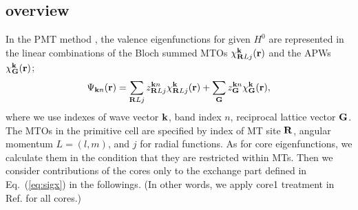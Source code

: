\documentclass[twocolumn,showpacs,preprintnumbers,amsmath,amssymb,floatfix]{revtex4-1}
\newcommand{\bfk}{{\bf k}}
\newcommand{\bfr}{{\bf r}}
\newcommand{\bfG}{{\bf G}}
\newcommand{\bfR}{{\bf R}}
\def\Psikn{\Psi_{{\bf k}n}}
\def\H0{H^0}
\newcommand{\req}[1]{\mbox{Eq.~\!(\ref{#1})}}
\def\Psikn{{\Psi_{{\bf k}n}}}
\def\brl{{\bf R}L}
\def\Psikn{{\Psi_{{\bf k}n}}}
\def\brl{{\bf R}L}
\def\H0{H^0}
\def\Psikn{{\Psi_{{\bf k}n}}}
\begin{document}
\subsection{overview}
\label{sec:ov}
In the PMT method \cite{kotani_fusion_2010}, 
the valence eigenfunctions for given $\H0$ are represented
in the linear combinations of the Bloch summed MTOs
$\chi^{\bfk}_{\brl{j}}({\bf r})$ and the APWs $\chi^{\bfk}_\bfG (\bfr)$;
\begin{eqnarray}
\label{eq:lmtopsi}
\Psikn(\bfr) = \sum_{\brl{j}} z^{{\bfk}n}_{\brl{j}}
\chi^{\bfk}_{\brl{j}}({\bfr})+ \sum_{\bfG} z^{\bfk n}_{\bfG}
\chi^{\bfk}_\bfG(\bfr),
\label{eqeigen}
\end{eqnarray}
where we use indexes of wave vector $\bfk$, band index $n$, 
reciprocal lattice vector $\bfG$. The MTOs in the primitive cell are 
specified by index of MT site $\bfR$, angular momentum $L=(l,m)$, and
$j$ for radial functions. 
As for core eigenfunctions, we calculate them in the condition
that they are restricted within MTs.
Then we consider contributions of the cores only to the exchange part 
defined in \req{eq:sigx} in the followings. 
(In other words, we apply core1 treatment in 
Ref. for all cores.)
\end{document}
